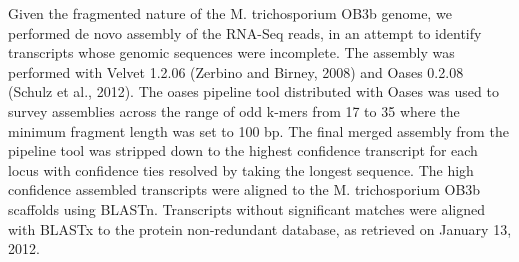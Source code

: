 Given the fragmented nature of the M. trichosporium OB3b genome, we performed de novo assembly of the RNA-Seq reads, in an attempt to identify transcripts whose genomic sequences were incomplete.
The assembly was performed with Velvet 1.2.06 (Zerbino and Birney, 2008) and Oases 0.2.08 (Schulz et al., 2012).
The oases pipeline tool distributed with Oases was used to survey assemblies across the range of odd k-mers from 17 to 35 where the minimum fragment length was set to 100 bp.
The final merged assembly from the pipeline tool was stripped down to the highest confidence transcript for each locus with confidence ties resolved by taking the longest sequence.
The high confidence assembled transcripts were aligned to the M. trichosporium OB3b scaffolds using BLASTn.
Transcripts without significant matches were aligned with BLASTx to the protein non-redundant database, as retrieved on January 13, 2012.


